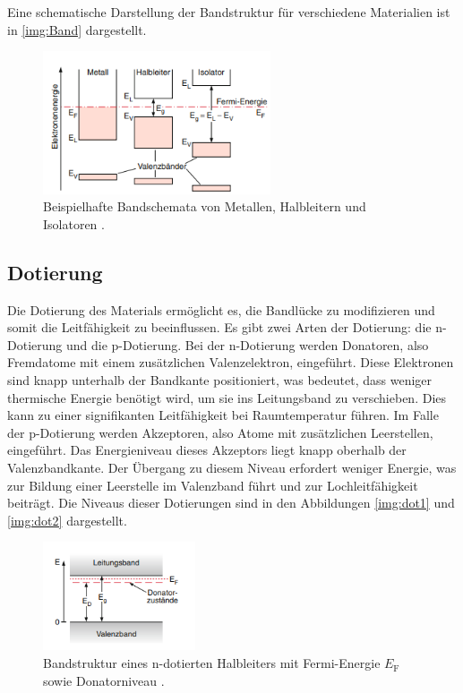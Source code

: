 Eine schematische Darstellung der Bandstruktur für verschiedene Materialien ist in \autoref{img:Band} dargestellt.


    \begin{figure}[H]
        \centering
        \includegraphics[width=0.6\textwidth]{Bilder/band.png}
        \caption{Beispielhafte Bandschemata von Metallen, Halbleitern und Isolatoren \cite{Demtröder}.}
        \label{img:Band}
    \end{figure}

    \subsection{Dotierung}

    Die Dotierung des Materials ermöglicht es, die Bandlücke zu modifizieren und somit die Leitfähigkeit zu beeinflussen. Es gibt zwei Arten der Dotierung: die n-Dotierung und die p-Dotierung.
Bei der n-Dotierung werden Donatoren, also Fremdatome mit einem zusätzlichen Valenzelektron, eingeführt. Diese Elektronen sind knapp unterhalb der Bandkante positioniert, was bedeutet, dass weniger thermische Energie benötigt wird, um sie ins Leitungsband zu verschieben. Dies kann zu einer signifikanten Leitfähigkeit bei Raumtemperatur führen.
Im Falle der p-Dotierung werden Akzeptoren, also Atome mit zusätzlichen Leerstellen, eingeführt. Das Energieniveau dieses Akzeptors liegt knapp oberhalb der Valenzbandkante. Der Übergang zu diesem Niveau erfordert weniger Energie, was zur Bildung einer Leerstelle im Valenzband führt und zur Lochleitfähigkeit beiträgt.
Die Niveaus dieser Dotierungen sind in den Abbildungen \autoref{img:dot1} und \autoref{img:dot2} dargestellt.

    \begin{figure}[H]
        \centering
        \includegraphics[width=0.4\textwidth]{Bilder/DonatorNiveau.png}
       \caption{Bandstruktur eines n-dotierten Halbleiters mit Fermi-Energie $E_{\text{F}}$ sowie Donatorniveau \cite{Demtröder}.}
        \label{img:dot1}
    \end{figure}

